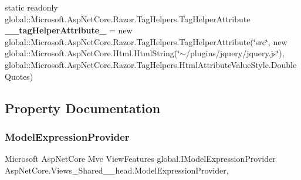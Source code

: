 \begin{DoxyCompactItemize}
\item 
\mbox{\label{class_asp_net_core_1_1_views___shared____head_a8bea6603777d916bd62bd5277c8d57a9}} 
static readonly global\+::\+Microsoft.\+Asp\+Net\+Core.\+Razor.\+Tag\+Helpers.\+Tag\+Helper\+Attribute {\bfseries \+\_\+\+\_\+tag\+Helper\+Attribute\+\_} = new global\+::\+Microsoft.\+Asp\+Net\+Core.\+Razor.\+Tag\+Helpers.\+Tag\+Helper\+Attribute(\char`\"{}src\char`\"{}, new global\+::\+Microsoft.\+Asp\+Net\+Core.\+Html.\+Html\+String(\char`\"{}$\sim$/plugins/jquery/jquery.\+js\char`\"{}), global\+::\+Microsoft.\+Asp\+Net\+Core.\+Razor.\+Tag\+Helpers.\+Html\+Attribute\+Value\+Style.\+Double\+Quotes)
\end{DoxyCompactItemize}


\subsection{Property Documentation}
\mbox{\label{class_asp_net_core_1_1_views___shared____head_a2bfb20f0e99a1322f67822289bbe84e4}} 
\subsubsection{\texorpdfstring{Model\+Expression\+Provider}{ModelExpressionProvider}}
{\footnotesize\ttfamily Microsoft Asp\+Net\+Core Mvc View\+Features global.\+I\+Model\+Expression\+Provider Asp\+Net\+Core.\+Views\+\_\+\+Shared\+\_\+\+\_\+head.\+Model\+Expression\+Provider\hspace{0.3cm}{\ttfamily [get]}, {}}

